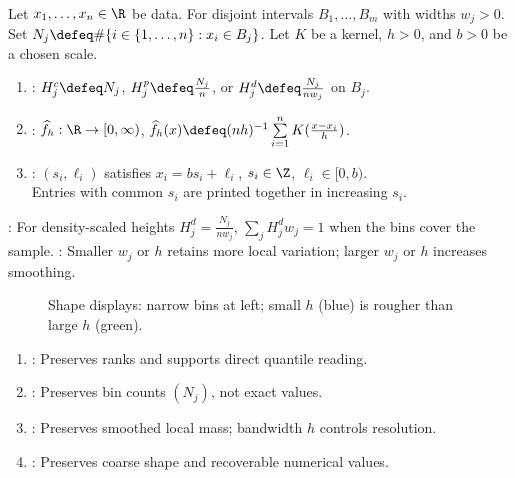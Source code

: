 \begin{definition} \label{def:histogram-density-and-stem-leaf-display} \\
Let $x_1,\ldots,x_n\in\R$ be data.  For disjoint intervals $B_1,\ldots,B_m$ with widths $w_j>0$.\\
Set $N_j\defeq\#\{i\in\{1,\ldots,n\}:x_i\in B_j\}$. Let $K$ be a kernel, $h>0$, and $b>0$ be a chosen scale.
\begin{enumerate}[label=(\roman*)]
\setlength{\itemsep}{0pt}
\item {}: $H_j^c\defeq N_j$, $H_j^p\defeq \frac{N_j}{n}$, or $H_j^d\defeq \frac{N_j}{nw_j}$ on $B_j$.
\item {}: $\widehat f_h:\R\to[0,\infty)$, $\widehat f_h(x)\defeq(nh)^{-1}\sum\limits_{i=1}^n K(\frac{x-x_i}{h})$.
\item {}: $(s_i,\ell_i)$ satisfies $x_i=bs_i+\ell_i$, $s_i\in\Z$, $\ell_i\in[0,b)$.\\
Entries with common $s_i$ are printed together in increasing $s_i$.
\end{enumerate}
: For density-scaled heights $H_j^d=\frac{N_j}{nw_j}$, $\sum\limits_j H_j^dw_j=1$ when the bins cover the sample.
: Smaller $w_j$ or $h$ retains more local variation; larger $w_j$ or $h$ increases smoothing.
\end{definition}

\begin{figure}[H]
  \centering
  
  \caption{Shape displays: narrow bins at left; small $h$ (blue) is rougher than large $h$ (green).}
  \label{fig:eda-histogram-kde-bandwidth}
\end{figure}

\begin{remark} \label{rem:shape-displays-lose-different-information} 
\begin{enumerate}[label=(\roman*)]
\setlength{\itemsep}{0pt}
\item {}: Preserves ranks and supports direct quantile reading.
\item {}: Preserves bin counts $(N_j)$, not exact values.
\item {}: Preserves smoothed local mass; bandwidth $h$ controls resolution.
\item {}: Preserves coarse shape and recoverable numerical values.
\end{enumerate}
\end{remark}
